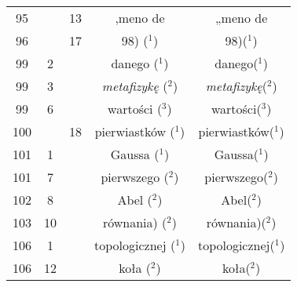 \documentclass[a4paper,11pt]{article}
\numberwithin{equation}{section}
\begin{document}
\begin{center}
\begin{tabular}{|c|c|c|c|c|}
    \hphantom{0}95 & & 13 & ,meno de & „meno de \\
    \hphantom{0}96 & & 17 & 98) ($^{ 1 }$) & 98)($^{ 1 }$) \\
    \hphantom{0}99 & \hphantom{0}2 & & danego ($^{ 1 }$) & danego($^{ 1 }$) \\
    \hphantom{0}99 & \hphantom{0}3 & & \textit{metafizykę} ($^{ 2 }$)
    & \textit{metafizykę}($^{ 2 }$) \\
    \hphantom{0}99 & \hphantom{0}6 & & wartości ($^{ 3 }$)
    & wartości($^{ 3 }$) \\
    100 & & 18 & pierwiastków ($^{ 1 }$) & pierwiastków($^{ 1 }$) \\
    101 & \hphantom{0}1 & & Gaussa ($^{ 1 }$) & Gaussa($^{ 1 }$) \\
    101 & \hphantom{0}7 & & pierwszego ($^{ 2 }$) & pierwszego($^{ 2 }$) \\
    102 & \hphantom{0}8 & & Abel ($^{ 2 }$) & Abel($^{ 2 }$) \\
    103 & 10 & & równania) ($^{ 2 }$) & równania)($^{ 2 }$) \\
    106 & \hphantom{0}1 & & topologicznej ($^{ 1 }$)
    & topologicznej($^{ 1 }$) \\
    106 & 12 & & koła ($^{ 2 }$) & koła($^{ 2 }$) \\
    \hline
  \end{tabular}





  \newpage


\end{center}
\end{document}
